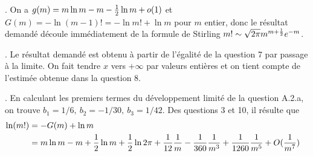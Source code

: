 {\begin{enumerate}
{. On a $g(m)=m\ln m - m - {1\over2}\ln m + o(1)$ et $G(m)=-\ln(m-1)!=-\ln m! + \ln m$ pour
$m$ entier, donc
le résultat demandé découle immédiatement de la formule de Stirling
$m! \sim \sqrt{2\pi} m^{m+{1\over2}} e^{-m}$.

. Le résultat demandé est obtenu à partir de l'égalité de la question 7 par passage à la
limite. On fait tendre $x$ vers $+\infty$ par valeurs entières et on tient compte de l'estimée
obtenue dans la question 8.

. En calculant les premiers termes du développement limité de la question A.2.a,
on trouve $b_1=1/6,\ b_2=-1/30,\ b_3=1/42$.
Des questions 3 et 10, il résulte que
$$\begin{aligned}
\ln(m!) &= -G(m) + \ln m        \cr
        &= m\ln m - m + {1\over2}\ln m + {1\over2}\ln2\pi
        + {1\over12} {1\over m} - {1\over360} {1\over m^3} + {1\over1260} {1\over m^5}
        + O({1\over m^7})  \cr
\end{aligned}
$$
}
\end{enumerate}
}
